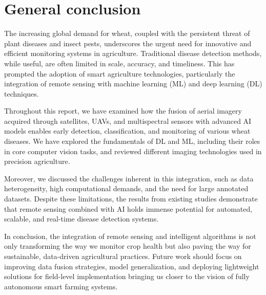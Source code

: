 \chapter*{General conclusion}
\label{chap.general-conclusion}

The increasing global demand for wheat, coupled with the persistent threat of plant diseases and insect pests, underscores the urgent need for innovative and efficient monitoring systems in agriculture. Traditional disease detection methods, while useful, are often limited in scale, accuracy, and timeliness. This has prompted the adoption of smart agriculture technologies, particularly the integration of remote sensing with machine learning (ML) and deep learning (DL) techniques.

Throughout this report, we have examined how the fusion of aerial imagery acquired through satellites, UAVs, and multispectral sensors with advanced AI models enables early detection, classification, and monitoring of various wheat diseases. We have explored the fundamentals of DL and ML, including their roles in core computer vision tasks, and reviewed different imaging technologies used in precision agriculture.

Moreover, we discussed the challenges inherent in this integration, such as data heterogeneity, high computational demands, and the need for large annotated datasets. Despite these limitations, the results from existing studies demonstrate that remote sensing combined with AI holds immense potential for automated, scalable, and real-time disease detection systems.

In conclusion, the integration of remote sensing and intelligent algorithms is not only transforming the way we monitor crop health but also paving the way for sustainable, data-driven agricultural practices. Future work should focus on improving data fusion strategies, model generalization, and deploying lightweight solutions for field-level implementation bringing us closer to the vision of fully autonomous smart farming systems.